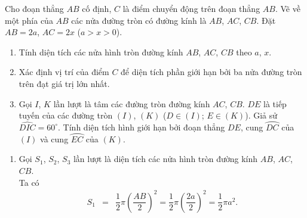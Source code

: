 \begin{bt}%
	Cho đoạn thẳng $AB$ cố định, $C$ là điểm chuyển động trên đoạn thẳng $AB$. Vẽ về một phía của $AB$ các nửa đường tròn có đường kính là $AB$, $AC$, $CB$. Đặt $AB=2a$, $AC=2x$ ($a>x>0$).
	\begin{enumerate}
		\item Tính diện tích các nửa hình tròn đường kính $AB$, $AC$, $CB$ theo $a$, $x$.
		\item Xác định vị trí của điểm $C$ để diện tích phần giới hạn bởi ba nửa đường tròn trên đạt giá trị lớn nhất.
		\item Gọi $I$, $K$ lần lượt là tâm các đường tròn đường kính $AC$, $CB$. $DE$ là tiếp tuyến của các đường tròn $(I)$, $(K)$ ($D \in (I)$; $E \in (K)$). Giả sử $\widehat{DIC}=60^\circ$. Tính diện tích hình giới hạn bởi đoạn thẳng $DE$, cung $\wideparen{DC}$ của $(I)$ và cung $\wideparen{EC}$ của $(K)$.
	\end{enumerate}
	\loigiai
	{
		\begin{center}
		\end{center}
		\begin{enumerate}
			\item Gọi $S_1$, $S_2$, $S_3$ lần lượt là diện tích các nửa hình tròn đường kính $AB$, $AC$, $CB$.\\
			Ta có
			\allowdisplaybreaks
			\begin{eqnarray*}
				S_1 &=& \dfrac{1}{2}\pi\left(\dfrac{AB}{2}\right)^2 = \dfrac{1}{2}\pi \left(\dfrac{2a}{2}\right)^2 = \dfrac{1}{2}\pi a^2.\\

\end{eqnarray*}
\end{enumerate}}
\end{bt}
